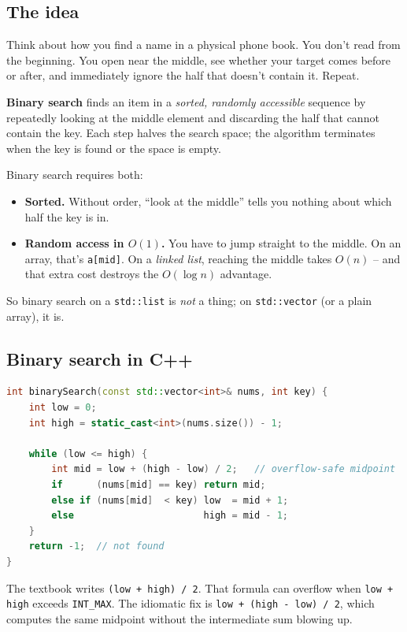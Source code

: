 \documentclass[11pt]{article}
\begin{document}
\subsection{The idea}

Think about how you find a name in a physical phone book. You don't
read from the beginning. You open near the middle, see whether your
target comes before or after, and immediately ignore the half that
doesn't contain it. Repeat.

\begin{defnbox}
\textbf{Binary search} finds an item in a \emph{sorted, randomly
accessible} sequence by repeatedly looking at the middle element and
discarding the half that cannot contain the key. Each step halves the
search space; the algorithm terminates when the key is found or the
space is empty.
\end{defnbox}

\begin{warnbox}
Binary search requires both:
\begin{itemize}[leftmargin=*]
  \item \textbf{Sorted.} Without order, ``look at the middle'' tells
        you nothing about which half the key is in.
  \item \textbf{Random access in \(O(1)\).} You have to jump straight
        to the middle. On an array, that's \texttt{a[mid]}. On a
        \emph{linked list}, reaching the middle takes $O(n)$ -- and
        that extra cost destroys the $O(\log n)$ advantage.
\end{itemize}
So binary search on a \texttt{std::list} is \emph{not} a thing; on
\texttt{std::vector} (or a plain array), it is.
\end{warnbox}

\subsection{Binary search in C++}

\begin{examplebox}
\begin{lstlisting}[basicstyle=\ttfamily\small,frame=single,language=C++]
int binarySearch(const std::vector<int>& nums, int key) {
    int low = 0;
    int high = static_cast<int>(nums.size()) - 1;

    while (low <= high) {
        int mid = low + (high - low) / 2;   // overflow-safe midpoint
        if      (nums[mid] == key) return mid;
        else if (nums[mid]  < key) low  = mid + 1;
        else                       high = mid - 1;
    }
    return -1;  // not found
}
\end{lstlisting}
The textbook writes \texttt{(low + high) / 2}. That formula can
overflow when \texttt{low + high} exceeds \texttt{INT\_MAX}. The
idiomatic fix is \texttt{low + (high - low) / 2}, which computes the
same midpoint without the intermediate sum blowing up.
\end{examplebox}
\end{document}
